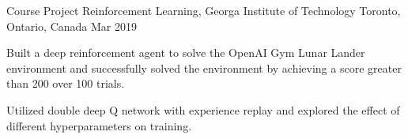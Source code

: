 


\begin{cventries}

  \cventry
    {Course Project} %
    {Reinforcement Learning, Georga Institute of Technology} %
    {Toronto, Ontario, Canada} %
    {Mar 2019} %
    {
      \begin{cvitems} %
        \item {Built a deep reinforcement agent to solve the OpenAI Gym Lunar Lander environment and successfully solved the environment by achieving a score greater than 200 over 100 trials.}
        \item {Utilized double deep Q network with experience replay and explored the effect of different hyperparameters on training.}
      \end{cvitems}
    }

\end{cventries}
